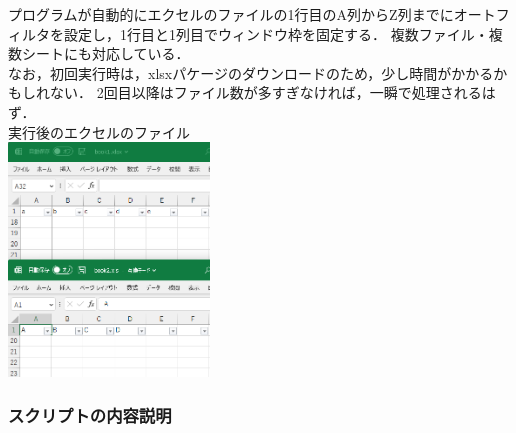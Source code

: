 \documentclass[
]{article}
\begin{document}
\begin{itemize}
  プログラムが自動的にエクセルのファイルの1行目のA列からZ列までにオートフィルタを設定し，1行目と1列目でウィンドウ枠を固定する．
  複数ファイル・複数シートにも対応している．\\
  なお，初回実行時は，xlsxパケージのダウンロードのため，少し時間がかかるかもしれない．
  2回目以降はファイル数が多すぎなければ，一瞬で処理されるはず．\\
  実行後のエクセルのファイル\\
  \includegraphics[width=0.4\textwidth,height=\textheight]{img/set_autofilter_freezepanel04.png}
\end{itemize}

\hypertarget{ux30b9ux30afux30eaux30d7ux30c8ux306eux5185ux5bb9ux8aacux660e}{%
\subsubsection{スクリプトの内容説明}\label{ux30b9ux30afux30eaux30d7ux30c8ux306eux5185ux5bb9ux8aacux660e}}
\end{document}
